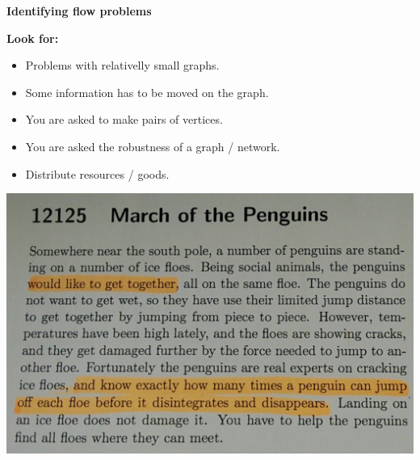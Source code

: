 \documentclass{beamer}
\begin{document}
\begin{frame}[fragile]

\begin{center}
{\color{black} \huge{\textbf{Identifying flow problems}}}
\end{center}

\end{frame}

\begin{frame}

\textbf{Look for:}

\begin{itemize}
 \item Problems with relativelly small graphs.
 \item Some information has to be moved on the graph.
 \item You are asked to make pairs of vertices.
 \item You are asked the robustness of a graph / network.
 \item Distribute resources / goods.
\end{itemize}


\end{frame}

\begin{frame}[fragile]

\begin{center}
\includegraphics[scale = 0.25]{example1.jpg}
\end{center}

\end{frame}
\end{document}
